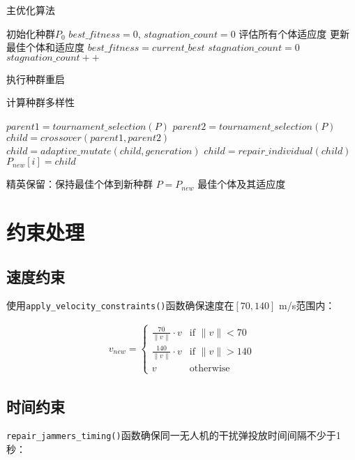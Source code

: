 \documentclass{article}
\begin{document}
\begin{algorithm}[H]
\caption{主优化算法}
\begin{algorithmic}[1]
\STATE 初始化种群$P_0$
\STATE $best\_fitness = 0$, $stagnation\_count = 0$
    \STATE 评估所有个体适应度
    \STATE 更新最佳个体和适应度
        \STATE $best\_fitness = current\_best$
        \STATE $stagnation\_count = 0$
    \ELSE
        \STATE $stagnation\_count++$
    \ENDIF
    
        \STATE 执行种群重启
    \ENDIF
    
    \STATE 计算种群多样性
    
        \STATE $parent1 = tournament\_selection(P)$
        \STATE $parent2 = tournament\_selection(P)$
        \STATE $child = crossover(parent1, parent2)$
        \STATE $child = adaptive\_mutate(child, generation)$
        \STATE $child = repair\_individual(child)$
        \STATE $P_{new}[i] = child$
    \ENDFOR
    
    \STATE 精英保留：保持最佳个体到新种群
    \STATE $P = P_{new}$
\ENDFOR
\RETURN 最佳个体及其适应度
\end{algorithmic}
\end{algorithm}

\section{约束处理}

\subsection{速度约束}
使用\texttt{apply\_velocity\_constraints()}函数确保速度在$[70, 140]$ m/s范围内：

\begin{align}
v_{new} = \begin{cases}
\frac{70}{\|v\|} \cdot v & \text{if } \|v\| < 70 \\
\frac{140}{\|v\|} \cdot v & \text{if } \|v\| > 140 \\
v & \text{otherwise}
\end{cases}
\end{align}

\subsection{时间约束}
\texttt{repair\_jammers\_timing()}函数确保同一无人机的干扰弹投放时间间隔不少于1秒：
\end{document}
